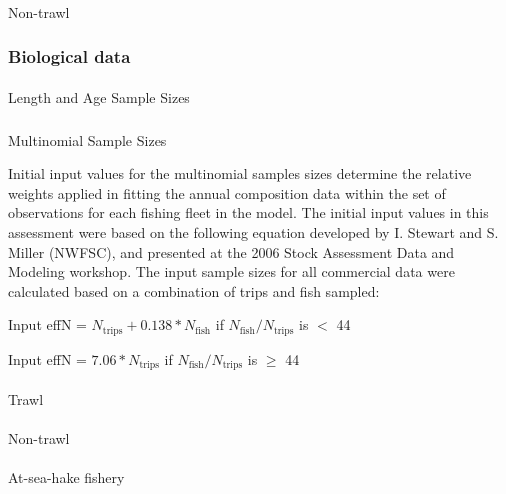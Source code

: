 \documentclass[
]{scrartcl}
\makeatletter
\let\oldparagraph\paragraph
\renewcommand{\paragraph}{
    \@ifstar
      \xxxParagraphStar
      \xxxParagraphNoStar
  }
\newcommand{\xxxParagraphStar}[1]{\oldparagraph*{#1}\mbox{}}
\newcommand{\xxxParagraphNoStar}[1]{\oldparagraph{#1}\mbox{}}
\let\oldsubparagraph\subparagraph
\renewcommand{\subparagraph}{
    \@ifstar
      \xxxSubParagraphStar
      \xxxSubParagraphNoStar
  }
\newcommand{\xxxSubParagraphStar}[1]{\oldsubparagraph*{#1}\mbox{}}
\newcommand{\xxxSubParagraphNoStar}[1]{\oldsubparagraph{#1}\mbox{}}
\makeatother
\begin{document}
\paragraph{Non-trawl}\label{non-trawl-1}

\subsubsection{Biological data}\label{biological-data}

\paragraph{Length and Age Sample
Sizes}\label{length-and-age-sample-sizes}

\subparagraph{Multinomial Sample Sizes}\label{multinomial-sample-sizes}

Initial input values for the multinomial samples sizes determine the
relative weights applied in fitting the annual composition data within
the set of observations for each fishing fleet in the model. The initial
input values in this assessment were based on the following equation
developed by I. Stewart and S. Miller (NWFSC), and presented at the 2006
Stock Assessment Data and Modeling workshop. The input sample sizes for
all commercial data were calculated based on a combination of trips and
fish sampled:

\begin{centering}

Input effN = $N_{\text{trips}} + 0.138 * N_{\text{fish}}$ if $N_{\text{fish}}/N_{\text{trips}}$ is $<$ 44

Input effN = $7.06 * N_{\text{trips}}$ if $N_{\text{fish}}/N_{\text{trips}}$ is $\geq$ 44

\end{centering}

\paragraph{Trawl}\label{trawl-2}

\paragraph{Non-trawl}\label{non-trawl-2}

\paragraph{At-sea-hake fishery}\label{at-sea-hake-fishery-1}
\end{document}
